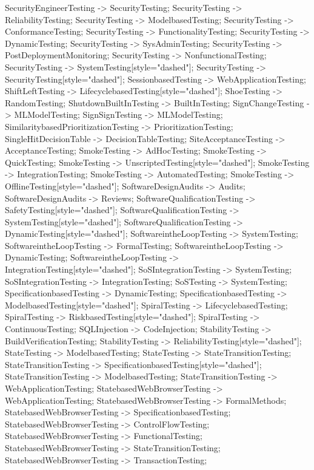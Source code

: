 \documentclass{article}
\begin{document}
{SecurityEngineerTesting -> SecurityTesting;
SecurityTesting -> ReliabilityTesting;
SecurityTesting -> ModelbasedTesting;
SecurityTesting -> ConformanceTesting;
SecurityTesting -> FunctionalityTesting;
SecurityTesting -> DynamicTesting;
SecurityTesting -> SysAdminTesting;
SecurityTesting -> PostDeploymentMonitoring;
SecurityTesting -> NonfunctionalTesting;
SecurityTesting -> SystemTesting[style="dashed"];
SecurityTesting -> SecurityTesting[style="dashed"];
SessionbasedTesting -> WebApplicationTesting;
ShiftLeftTesting -> LifecyclebasedTesting[style="dashed"];
ShoeTesting -> RandomTesting;
ShutdownBuiltInTesting -> BuiltInTesting;
SignChangeTesting -> MLModelTesting;
SignSignTesting -> MLModelTesting;
SimilaritybasedPrioritizationTesting -> PrioritizationTesting;
SingleHitDecisionTable -> DecisionTableTesting;
SiteAcceptanceTesting -> AcceptanceTesting;
SmokeTesting -> AdHocTesting;
SmokeTesting -> QuickTesting;
SmokeTesting -> UnscriptedTesting[style="dashed"];
SmokeTesting -> IntegrationTesting;
SmokeTesting -> AutomatedTesting;
SmokeTesting -> OfflineTesting[style="dashed"];
SoftwareDesignAudits -> Audits;
SoftwareDesignAudits -> Reviews;
SoftwareQualificationTesting -> SafetyTesting[style="dashed"];
SoftwareQualificationTesting -> SystemTesting[style="dashed"];
SoftwareQualificationTesting -> DynamicTesting[style="dashed"];
SoftwareintheLoopTesting -> SystemTesting;
SoftwareintheLoopTesting -> FormalTesting;
SoftwareintheLoopTesting -> DynamicTesting;
SoftwareintheLoopTesting -> IntegrationTesting[style="dashed"];
SoSIntegrationTesting -> SystemTesting;
SoSIntegrationTesting -> IntegrationTesting;
SoSTesting -> SystemTesting;
SpecificationbasedTesting -> DynamicTesting;
SpecificationbasedTesting -> ModelbasedTesting[style="dashed"];
SpiralTesting -> LifecyclebasedTesting;
SpiralTesting -> RiskbasedTesting[style="dashed"];
SpiralTesting -> ContinuousTesting;
SQLInjection -> CodeInjection;
StabilityTesting -> BuildVerificationTesting;
StabilityTesting -> ReliabilityTesting[style="dashed"];
StateTesting -> ModelbasedTesting;
StateTesting -> StateTransitionTesting;
StateTransitionTesting -> SpecificationbasedTesting[style="dashed"];
StateTransitionTesting -> ModelbasedTesting;
StateTransitionTesting -> WebApplicationTesting;
StatebasedWebBrowserTesting -> WebApplicationTesting;
StatebasedWebBrowserTesting -> FormalMethods;
StatebasedWebBrowserTesting -> SpecificationbasedTesting;
StatebasedWebBrowserTesting -> ControlFlowTesting;
StatebasedWebBrowserTesting -> FunctionalTesting;
StatebasedWebBrowserTesting -> StateTransitionTesting;
StatebasedWebBrowserTesting -> TransactionTesting;
}
\end{document}
